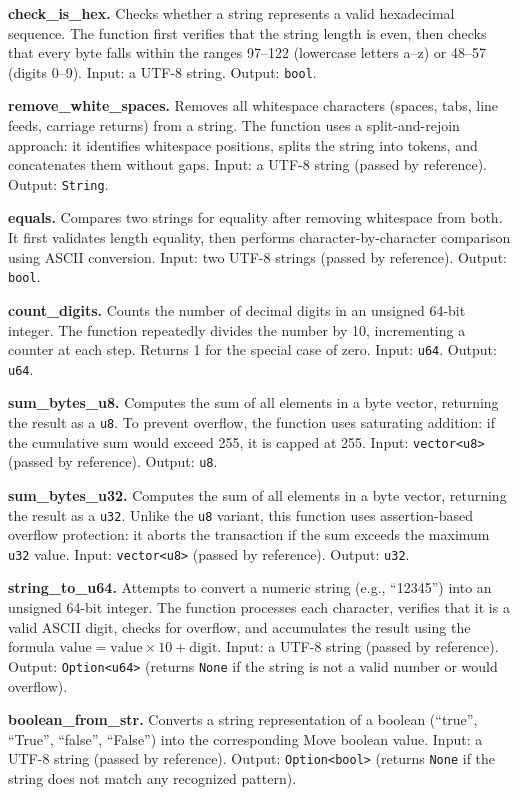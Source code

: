 \documentclass[12pt,a4paper]{article}
\begin{document}
\textbf{check\_is\_hex.} Checks whether a string represents a valid hexadecimal sequence. The function first verifies that the string length is even, then checks that every byte falls within the ranges 97--122 (lowercase letters a--z) or 48--57 (digits 0--9). Input: a UTF-8 string. Output: \texttt{bool}.

\textbf{remove\_white\_spaces.} Removes all whitespace characters (spaces, tabs, line feeds, carriage returns) from a string. The function uses a split-and-rejoin approach: it identifies whitespace positions, splits the string into tokens, and concatenates them without gaps. Input: a UTF-8 string (passed by reference). Output: \texttt{String}.

\textbf{equals.} Compares two strings for equality after removing whitespace from both. It first validates length equality, then performs character-by-character comparison using ASCII conversion. Input: two UTF-8 strings (passed by reference). Output: \texttt{bool}.

\textbf{count\_digits.} Counts the number of decimal digits in an unsigned 64-bit integer. The function repeatedly divides the number by 10, incrementing a counter at each step. Returns 1 for the special case of zero. Input: \texttt{u64}. Output: \texttt{u64}.

\textbf{sum\_bytes\_u8.} Computes the sum of all elements in a byte vector, returning the result as a \texttt{u8}. To prevent overflow, the function uses saturating addition: if the cumulative sum would exceed 255, it is capped at 255. Input: \texttt{vector<u8>} (passed by reference). Output: \texttt{u8}.

\textbf{sum\_bytes\_u32.} Computes the sum of all elements in a byte vector, returning the result as a \texttt{u32}. Unlike the \texttt{u8} variant, this function uses assertion-based overflow protection: it aborts the transaction if the sum exceeds the maximum \texttt{u32} value. Input: \texttt{vector<u8>} (passed by reference). Output: \texttt{u32}.


\textbf{string\_to\_u64.} Attempts to convert a numeric string (e.g., ``12345'') into an unsigned 64-bit integer. The function processes each character, verifies that it is a valid ASCII digit, checks for overflow, and accumulates the result using the formula $\text{value} = \text{value} \times 10 + \text{digit}$. Input: a UTF-8 string (passed by reference). Output: \texttt{Option<u64>} (returns \texttt{None} if the string is not a valid number or would overflow).

\textbf{boolean\_from\_str.} Converts a string representation of a boolean (``true'', ``True'', ``false'', ``False'') into the corresponding Move boolean value. Input: a UTF-8 string (passed by reference). Output: \texttt{Option<bool>} (returns \texttt{None} if the string does not match any recognized pattern).
\end{document}

